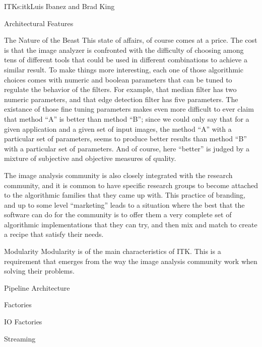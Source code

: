 \begin{aosachapter}{ITK}{s:itk}{Luis Ibanez and Brad King}
\begin{aosasect1}{Architectural Features}
\begin{aosasect2}{The Nature of the Beast}
This state of affairs, of course comes at a price. The cost is that the image
analyzer is confronted with the difficulty of choosing among tens of different
tools that could be used in different combinations to achieve a similar result.
To make things more interesting, each one of those algorithmic choices comes
with numeric and boolean parameters that can be tuned to regulate the behavior
of the filters. For example, that median filter has two numeric parameters, and
that edge detection filter has five parameters. The existance of those fine
tuning parameters makes even more difficult to ever claim that method ``A'' is
better than method ``B''; since we could only say that for a given application
and a given set of input images, the method ``A'' with a particular set of
parameters, seems to produce better results than method ``B'' with a particular
set of parameters. And of course, here ``better'' is judged by a mixture of
subjective and objective measures of quality.

The image analysis community is also closely integrated with the research
community, and it is common to have specific research groups to become attached
to the algorithmic families that they came up with. This practice of branding,
and up to some level ``marketing'' leads to a situation where the best that the
software can do for the community is to offer them a very complete set of
algorithmic implementations that they can try, and then mix and match to create
a recipe that satisfy their needs.

\end{aosasect2}

\begin{aosasect2}{Modularity}
Modularity is of the main characteristics of ITK. This is a requirement that
emerges from the way the image analysis community work when solving their
problems.

\end{aosasect2}

\begin{aosasect2}{Pipeline Architecture}
\end{aosasect2}

\begin{aosasect2}{Factories}
\end{aosasect2}

\begin{aosasect2}{IO Factories}
\end{aosasect2}

\begin{aosasect2}{Streaming}
\end{aosasect2}


\end{aosasect1}
\end{aosachapter}
